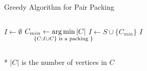 \begin{frame}{Greedy Algorithm for Pair Packing}
\begin{columns}[T]

\begin{column}{.5\linewidth}


\begin{algorithm}[H]
\caption{Greedy Algorithm}
\begin{algorithmic}[1]
\STATE $I \gets \emptyset$
\STATE
$C_{min} \gets \smashoperator{\argmin\limits_{\{C : I \cup C\} \text{ is a packing }\}}}|C|$
\STATE $I \gets S \cup \{ C_{min} \}$
\ENDWHILE
\RETURN $I$
\end{algorithmic}
\end{algorithm}

\end{column}\hfill\begin{column}{.5\linewidth}

\addtocounter{algorithm}{-1}


\end{column}\end{columns}
\vfill
* $|C|$ is the number of vertices in $C$
\end{frame}
